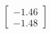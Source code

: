 \documentclass[preview]{standalone}
\begin{document}
\begin{align*}
\begin{bmatrix} -1.46 \\ -1.48 \end{bmatrix}
\end{align*}
\end{document}
